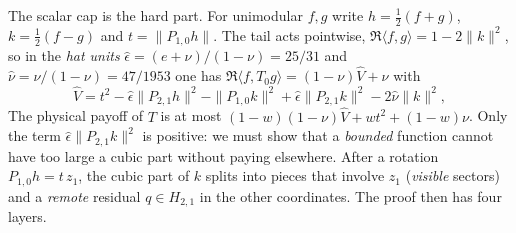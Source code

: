 \documentclass[11pt,a4paper]{article}
\begin{document}
The scalar cap is the hard part. For unimodular $f,g$ write $h=\tfrac12(f+g)$, $k=\tfrac12(f-g)$ and $t=\|P_{1,0}h\|$.
The tail acts pointwise, $\Re\langle f,g\rangle=1-2\|k\|^2$, so in the \emph{hat units} $\hat\epsilon=(e+\nu)/(1-\nu)=25/31$
and $\hat\nu=\nu/(1-\nu)=47/1953$ one has $\Re\langle f,T_0g\rangle=(1-\nu)\hat V+\nu$ with
\[
 \hat V=t^2-\hat\epsilon\|P_{2,1}h\|^2-\|P_{1,0}k\|^2+\hat\epsilon\|P_{2,1}k\|^2-2\hat\nu\|k\|^2,
\]
The physical payoff of $T$ is at most
$(1-w)(1-\nu)\hat V+wt^2+(1-w)\nu$.
Only the term $\hat\epsilon\|P_{2,1}k\|^2$ is positive: we must show that a \emph{bounded} function cannot have too large a
cubic part without paying elsewhere. After a rotation $P_{1,0}h=t\,z_1$, the cubic part of $k$ splits into pieces that
involve $z_1$ (\emph{visible} sectors) and a \emph{remote} residual $q\in H_{2,1}$ in the other coordinates. The proof then
has four layers.
\end{document}
